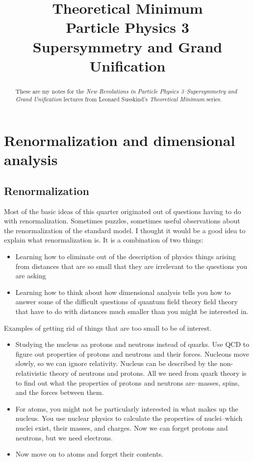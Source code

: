 \documentclass[]{article}
\title{Theoretical Minimum\\Particle Physics 3\\Supersymmetry and Grand Unification}
\author{}
\begin{document}
\maketitle

\begin{abstract}
	These are my notes for the \emph{New Revolutions in Particle Physics 3--Supersymmetry and Grand Unification} lectures from Leonard Susskind's \emph{Theoretical Minimum} series\cite{susskind2010supersymmetry}.
\end{abstract}

\tableofcontents
\listoffigures
\listoftables
\listoftheorems

\section{Renormalization  and dimensional analysis}

\subsection{Renormalization}

Most of the basic ideas of this quarter originated out of questions having to do with renormalization. Sometimes puzzles, sometimes useful observations about the renormalization of the standard model. I thought it would be a good idea to explain what renormalization is. It  is a combination of two things:
\begin{itemize}
	\item Learning how to eliminate out of the description of physics things arising from distances that are so small that they are irrelevant to the questions you are asking
	\item Learning how to think about how dimensional analysis tells you how to answer some of the difficult questions of quantum field theory field theory that have to do with distances much smaller than you might be interested in.
\end{itemize}

Examples of getting rid of things that are too small to be of interest.
\begin{itemize}
	\item Studying the nucleus aa protons and neutrons instead of quarks. Use QCD to figure out properties of protons and neutrons and their forces. Nucleons move slowly, so we can ignore relativity. Nucleus can be described by the non-relativistic theory of neutrons and protons. All we need from quark theory is to find out what the properties of protons and neutrons are--masses, spins, and the forces between them.
	\item For atoms, you might not be particularly interested in what makes up the nucleus. You use nuclear physics to calculate the properties of nuclei--which nuclei exist, their masses, and charges. Now we can forget protons and neutrons, but we need electrons.
	\item Now move on to atoms and forget their contents.
\end{itemize}
\end{document}
